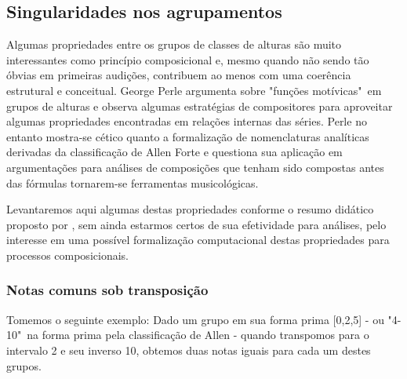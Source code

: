 \documentclass[
	12pt,				%
	openright,			%
	twoside,			%
	a4paper,			%
	english,			%
	french,				%
	spanish,			%
	brazil				%
	]{abntex2}
\begin{document}




\subsection{Singularidades nos agrupamentos }

Algumas propriedades entre os grupos de classes de alturas são muito interessantes como princípio composicional e, mesmo quando não sendo tão óbvias em primeiras audições, contribuem ao menos com uma coerência estrutural e conceitual. George Perle argumenta sobre "funções motívicas"\ em grupos de alturas \cite [p. 60-85]{perle1991serial} e observa algumas estratégias de compositores para aproveitar algumas propriedades encontradas em relações internas das séries. Perle no entanto mostra-se cético quanto a formalização de nomenclaturas analíticas derivadas da classificação de Allen Forte e questiona sua aplicação em argumentações para análises de composições que tenham sido compostas antes das fórmulas tornarem-se ferramentas musicológicas. \cite{perle1990pitch}

Levantaremos aqui algumas destas propriedades conforme o resumo didático proposto por , sem ainda estarmos certos de sua efetividade para análises, pelo interesse em uma possível formalização computacional destas propriedades para processos composicionais.


\subsubsection{Notas comuns sob transposição}

Tomemos o seguinte exemplo: Dado um grupo em sua forma prima [0,2,5] - ou "4-10"\ na forma prima pela classificação de Allen  - quando transpomos para o intervalo 2 e seu inverso 10, obtemos duas notas iguais para cada um destes grupos.
\end{document}
